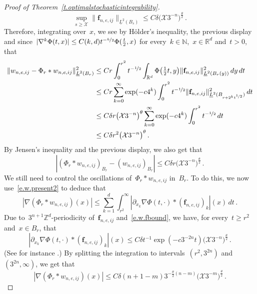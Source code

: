 \documentclass[11pt,twoside]{article} %
\numberwithin{equation}{section}
\theoremstyle{definition}
\newcommand*{\N}{\ensuremath{\mathbb{N}}}
\newcommand*{\Z}{\ensuremath{\mathbb{Z}}}
\newcommand*{\R}{\ensuremath{\mathbb{R}}}
\newcommand{\f}{\mathbf{f}}
\newcommand{\X}{\mathcal{X}}
\begin{document}
\begin{proof}[Proof of Theorem~\ref{t.optimalstochasticintegrability}]
\begin{equation}
\sup_{ s \geq \X } \| \f_{n,e,ij} \|_{\underline{L}^2(B_s) } \leq C \delta \bigl( \X 3^{-n} \bigr)^{\frac\theta2} \,.
\end{equation}
Therefore, integrating over~$x$, we see by H\"older's inequality, the previous display and since~$|\nabla^k \Phi(t,x)| \leq C(k,d)t^{-\nicefrac k2} \Phi(\frac t2,x)$ for every~$k \in \N$,~$x\in \R^d$ and~$t>0$,  that 
\begin{align*}  
\| w_{n,e,ij} - \Phi_r \ast w_{n,e,ij} \|_{\underline{L}^2(B_r)}^2
& 
\leq  
C r \int_0^{r^2} t^{-\nicefrac12}  \int_{\R^d} \Phi\bigl(\tfrac12 t,y\bigr) \| \f_{n,e,ij} \|_{\underline{L}^2(B_r(y))}^2 \, dy \, dt 
\\ 
&
\leq C r \sum_{k=0}^\infty \exp(-c 4^k) \int_0^{r^2} t^{-\nicefrac12}  \| \f_{n,e,ij}\|_{\underline{L}^2(B_{r + 2^k t^{\nicefrac12}})}^2 \, dt
\\ 
&
\leq C \delta  r \bigl( \X 3^{-n} \bigr)^{\theta}  \sum_{k=0}^\infty \exp(-c 4^k) \int_0^{r^2} t^{-\nicefrac12}  \, dt    
\\ 
&
\leq C \delta r^2 \bigl( \X 3^{-n} \bigr)^{\theta}
\,.
\end{align*}
By Jensen's inequality and the previous display, we also get that 
\begin{equation*}  
|(\Phi_r \ast w_{n,e,ij})_{B_r}  - (w_{n,e,ij})_{B_r}|  
\leq 
C \delta  r \bigl( \X 3^{-n} \bigr)^{\frac\theta2}\,.
\end{equation*}
We still need to control the oscillations of~$\Phi_r \ast w_{n,e,ij}$ in~$B_r$. To do this, we now use~\eqref{e.w.present2} to deduce that 
\begin{equation*}  
| \nabla (\Phi_r \ast w_{n,e,ij})(x)|  \leq \sum_{k=1}^d  \int_{r^2}^\infty   | \partial_{x_k} \nabla \Phi( t ,\cdot) \ast  (\f_{n,e,ij})_k|  (x) \, dt  \,.
\end{equation*}
Due to~$3^{n+1}\Z^d$-periodicity of~$\f_{n,e,ij}$ and~\eqref{e.w.fbound}, we have, for every~$t \geq r^2$ and~$x \in B_r$, that  
\begin{equation*}  
 | \partial_{x_k} \nabla \Phi( t ,\cdot) \ast  (\f_{n,e,ij})_k|  (x) \leq C \delta  t^{-1} \exp(-c 3^{-2n} t ) \bigl( \X 3^{-n} \bigr)^{\frac\theta2}  \,.
\end{equation*}
(See for instance \cite[Exercise 3.24]{AKMBook}.) By splitting the integration to intervals~$(r^2,3^{2n})$ and~$(3^{2n},\infty)$, we get that 
\begin{equation*}  
| \nabla (\Phi_r \ast w_{n,e,ij})(x)|  \leq  C \delta (n +1 -m) 3^{-\frac\theta2(n-m)} \bigl( \X 3^{-m} \bigr)^{\frac\theta2} \,.

\end{equation*}
\end{proof}
\end{document}
